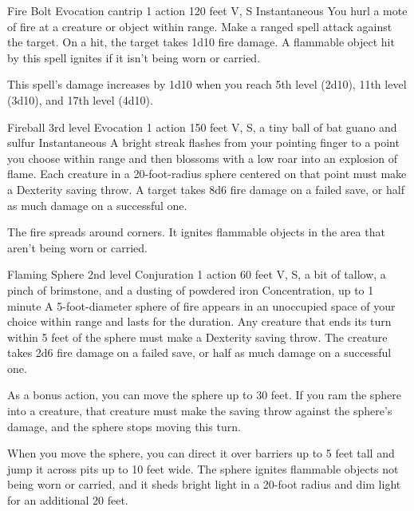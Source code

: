 \documentclass[10pt,a4paper,twoside,bg=print,twocolumn,openany,nodeprecatedcode]{dndbook}
\begin{document}


\DndSpellHeader%
{Fire Bolt}
{Evocation cantrip}
{1 action}
{120 feet}
{V, S}
{Instantaneous}
You hurl a mote of fire at a creature or object within range. Make a ranged spell attack against the target. On a hit, the target takes 1d10 fire damage. A flammable object hit by this spell ignites if it isn't being worn or carried.

This spell's damage increases by 1d10 when you reach 5th level (2d10), 11th level (3d10), and 17th level (4d10).



\DndSpellHeader%
{Fireball}
{3rd level Evocation}
{1 action}
{150 feet}
{V, S, a tiny ball of bat guano and sulfur}
{Instantaneous}
A bright streak flashes from your pointing finger to a point you choose within range and then blossoms with a low roar into an explosion of flame. Each creature in a 20-foot-radius sphere centered on that point must make a Dexterity saving throw. A target takes 8d6 fire damage on a failed save, or half as much damage on a successful one.

The fire spreads around corners. It ignites flammable objects in the area that aren't being worn or carried.



\DndSpellHeader%
{Flaming Sphere}
{2nd level Conjuration}
{1 action}
{60 feet}
{V, S, a bit of tallow, a pinch of brimstone, and a dusting of powdered iron}
{Concentration, up to 1 minute}
A 5-foot-diameter sphere of fire appears in an unoccupied space of your choice within range and lasts for the duration. Any creature that ends its turn within 5 feet of the sphere must make a Dexterity saving throw. The creature takes 2d6 fire damage on a failed save, or half as much damage on a successful one.

As a bonus action, you can move the sphere up to 30 feet. If you ram the sphere into a creature, that creature must make the saving throw against the sphere's damage, and the sphere stops moving this turn.

When you move the sphere, you can direct it over barriers up to 5 feet tall and jump it across pits up to 10 feet wide. The sphere ignites flammable objects not being worn or carried, and it sheds bright light in a 20-foot radius and dim light for an additional 20 feet.

\end{document}
